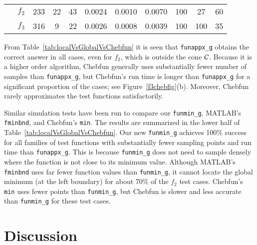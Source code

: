 \documentclass[review]{elsarticle}
\theoremstyle{definition}
\newcommand{\funappxg}{\texttt{funappx\_g}\xspace}
\newcommand{\funming}{\texttt{funmin\_g}\xspace}
\newcommand{\fminbnd}{\texttt{fminbnd}\xspace}
\begin{document}
\begin{table}[bt]
{\begin{tabular}{crrrrrrrrrrrrrrrrrr}
			\\ $\phantom{-}f_2$   & \multicolumn{2}{c}{233} &  \multicolumn{2}{c}{22} &
			\multicolumn{2}{c}{43} &  \multicolumn{2}{c}{0.0024} &  
			\multicolumn{2}{c}{0.0010} &
			\multicolumn{2}{c}{0.0070} &  \multicolumn{2}{c}{100} &  \multicolumn{2}{c}{27} 
			&
			\multicolumn{2}{c}{60}
			\\ $\phantom{-}f_3$   &  \multicolumn{2}{c}{316} &  \multicolumn{2}{c}{9} &
			\multicolumn{2}{c}{22 } &  \multicolumn{2}{c}{0.0026} &  
			\multicolumn{2}{c}{0.0008} &
			\multicolumn{2}{c}{0.0039} &  \multicolumn{2}{c}{100} &  \multicolumn{2}{c}{100} 
			&
			\multicolumn{2}{c}{35}
			\\ \hline
		\end{tabular}
	}
\end{table}


%

From Table~\ref{tab:localVsGlobalVsChebfun} it is seen that \funappxg{} obtains 
the correct answer in all cases,
even for $f_2$, which is outside the cone $\mathcal{C}$. Because it is a higher order algorithm, 
Chebfun generally uses substantially fewer number of samples than
\funappxg, but Chebfun's run time is longer than \funappxg for a
significant proportion of the cases; see Figure~\ref{f3chebfig}(b). Moreover, Chebfun 
rarely approximates the test functions satisfactorily.


Similar simulation tests have been run to compare our \funming, MATLAB's \fminbnd, and
Chebfun's \texttt{min}. The results are summarized in the lower half of
Table~\ref{tab:localVsGlobalVsChebfun}. Our new \funming{} achieves 100\%
success for all families of test functions with substantially fewer sampling
points and run time than \funappxg. This is because \funming does not need to
sample densely where the function is not close to its minimum value. Although MATLAB's
\fminbnd uses far fewer function values than \funming, it cannot locate the
global minimum (at the left boundary) for about 70\% of the $f_2$ test cases.
Chebfun's {\tt min} uses fewer points than \funming, but Chebfun is slower and
less accurate than \funming for these test cases.






\section{Discussion}
\end{document}
